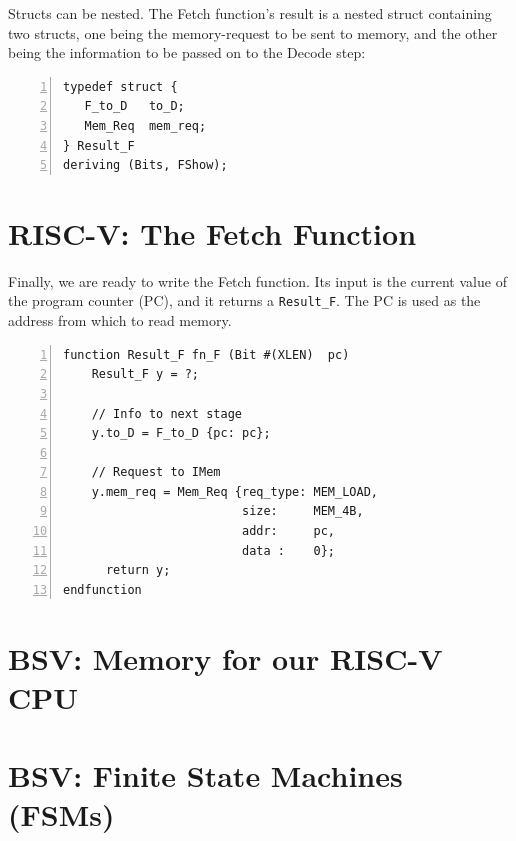 
Structs can be nested.  The Fetch function's result is a nested struct
containing two structs, one being the memory-request to be sent to
memory, and the other being the information to be passed on to the
Decode step:

\begin{Verbatim}[frame=single, numbers=left]
typedef struct {
   F_to_D   to_D;
   Mem_Req  mem_req;
} Result_F
deriving (Bits, FShow);
\end{Verbatim}


\section{RISC-V: The Fetch Function}

\label{Sec_FSM_Fetch_Fn_F}

Finally, we are ready to write the Fetch function.  Its input is the
current value of the program counter (PC), and it returns a
\verb|Result_F|.  The PC is used as the address from which to read
memory.

\begin{Verbatim}[frame=single, numbers=left]
function Result_F fn_F (Bit #(XLEN)  pc)
    Result_F y = ?;

    // Info to next stage
    y.to_D = F_to_D {pc: pc};

    // Request to IMem
    y.mem_req = Mem_Req {req_type: MEM_LOAD,
                         size:     MEM_4B,
                         addr:     pc,
                         data :    0};
      return y;
endfunction
\end{Verbatim}


\section{BSV: Memory for our RISC-V CPU}



\section{BSV: Finite State Machines (FSMs)}


